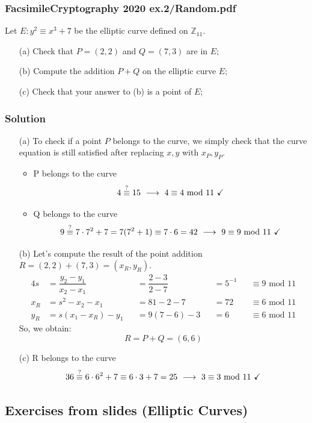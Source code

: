 \documentclass[11pt, a4paper]{article}
\newcommand{\mymod}{
    \text{ mod }
}
\begin{document}
\newpage
\subsubsection{FacsimileCryptography 2020 ex.2/Random.pdf}
Let $E:y^2\equiv x^3+7$ be the elliptic curve defined on $\mathbb{Z}_{11}$.
\begin{itemize}
    \item[(a)] Check that $P=(2,2)$ and $Q=(7,3)$ are in $E$;
    \item[(b)] Compute the addition $P+Q$ on the elliptic curve $E$;
    \item[(c)] Check that your answer to (b) is a point of $E$;
\end{itemize}

\subsubsection*{Solution}
\begin{itemize}
    \item[(a)] To check if a point $P$ belongs to the curve, we simply check that the curve equation is still satisfied after replacing $x,y$ with $x_P,y_P$.
    \begin{itemize}
        \item P belongs to the curve
        $$4\stackrel{\text{?}}{\equiv}15\ \longrightarrow\ 4\equiv4\mymod11\text{ \checkmark}$$
        \item Q belongs to the curve
        $$9\stackrel{\text{?}}{\equiv}7\cdot7^2+7=7(7^2+1)\equiv7\cdot6=42\ \longrightarrow\ 9\equiv9\mymod11\text{ \checkmark}$$
    \end{itemize}
    \item[(b)] Let's compute the result of the point addition $R=(2,2)+(7,3)=(x_R,y_R)$.
    \begin{alignat*}{4}
        s&=\dfrac{y_2-y_1}{x_2-x_1}&&=\dfrac{2-3}{2-7}&&=5^{-1}&&\equiv9\mymod11\\
        x_R&=s^2-x_2-x_1&&=81-2-7&&=72&&\equiv6\mymod11\\
        y_R&=s(x_1-x_R)-y_1&&=9(7-6)-3&&=6&&\equiv6\mymod11
    \end{alignat*}
    So, we obtain:
    $$R=P+Q=(6,6)$$
    \item[(c)] R belongs to the curve
    $$36\stackrel{\text{?}}{\equiv}6\cdot6^2+7\equiv6\cdot3+7=25\ \longrightarrow\ 3\equiv3\mymod11\text{ \checkmark}$$
\end{itemize}

\newpage
\subsection{Exercises from slides (Elliptic Curves)}
\end{document}
